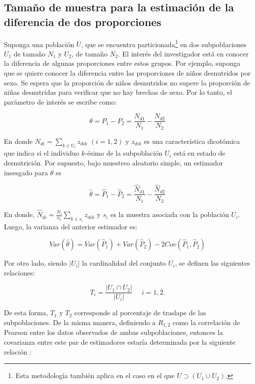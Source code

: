 \documentclass[
  12pt,
]{book}
\begin{document}
\hypertarget{tamauxf1o-de-muestra-para-la-estimaciuxf3n-de-la-diferencia-de-dos-proporciones}{%
\subsection{Tamaño de muestra para la estimación de la diferencia de dos proporciones}\label{tamauxf1o-de-muestra-para-la-estimaciuxf3n-de-la-diferencia-de-dos-proporciones}}

Suponga una población \(U\), que se encuentra particionada\footnote{Esta metodología también aplica en el caso en el que \(U \supset (U_1 \cup U_2)\).} en dos subpoblaciones \(U_1\) de tamaño \(N_1\) y \(U_2\), de tamaño \(N_2\). El interés del investigador está en conocer la diferencia de algunas proporciones entre estos grupos. Por ejemplo, suponga que se quiere conocer la diferencia entre las proporciones de niños desnutridos por sexo. Se espera que la proporción de niños desnutridos no supere la proporción de niñas desnutridas para verificar que no hay brechas de sexo. Por lo tanto, el parámetro de interés se escribe como:

\[
\theta=P_1-P_2=\frac{N_{d1}}{N_1}-\frac{N_{d2}}{N_2}
\]

En donde \(N_{di}=\sum_{k\in U_i}z_{dik}\) \((i=1,2)\) y \(z_{dik}\) es una característica dicotómica que indica si el individuo \(k\)-ésimo de la subpoblación \(U_i\) está en estado de desnutrición. Por supuesto, bajo muestreo aleatorio simple, un estimador insesgado para \(\theta\) es

\[
\hat{\theta}=\hat{P}_1-\hat{P}_2=\frac{\hat{N}_{d1}}{N_1}-\frac{\hat{N}_{d2}}{N_2}
\]

En donde, \(\hat{N}_{di}=\frac{N_i}{n_i}\sum_{k\in s_i}z_{dik}\) y \(s_i\) es la muestra asociada con la población \(U_i\). Luego, la varianza del anterior estimador es:

\[
Var(\hat{\theta})=Var\left(\hat{P}_1\right)+Var\left(\hat{P}_2\right)-2Cov\left(\hat{P}_1, \hat{P}_2\right)
\]

Por otro lado, siendo \(|U_i|\) la cardinalidad del conjunto \(U_i\), se definen las siguientes relaciones:

\[
T_i = \frac{|U_1 \cap U_2|}{|U_i|} \ \ \ \ \ \ i =1, 2. 
\]

De esta forma, \(T_1\) y \(T_2\) corresponde al porcentaje de traslape de las subpoblaciones. De la misma manera, definiendo a \(R_{1,2}\) como la correlación de Pearson entre los datos observados de ambas subpoblaciones, entonces la covarianza entre este par de estimadores estaría determinada por la siguiente relación \citep{Kish_2004}:
\end{document}
